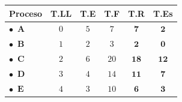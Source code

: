 \documentclass[10pt, a4paper]{article}
\begin{document}
\begin{minipage}{\linewidth}
\begin{minipage}[t]{0.275\linewidth}
\vspace{0pt}
\centering\footnotesize\setlength{\tabcolsep}{3.5pt}\renewcommand{\arraystretch}{1.1}
\begin{tabular}{lccccc}\toprule
\textbf{Proceso} & \textbf{T.LL} & \textbf{T.E} & \textbf{T.F} & \textbf{T.R} & \textbf{T.Es} \\ \midrule
\textcolor{col0}{$\bullet$}\ \textcolor{col0}{$\mathbf{A}$} & $0$ & $5$ & $7$ & \textcolor{tr}{$\boldsymbol{7}$} & \textcolor{es}{$\boldsymbol{2}$} \\
\textcolor{col1}{$\bullet$}\ \textcolor{col1}{$\mathbf{B}$} & $1$ & $2$ & $3$ & \textcolor{tr}{$\boldsymbol{2}$} & \textcolor{es}{$\boldsymbol{0}$} \\
\textcolor{col2}{$\bullet$}\ \textcolor{col2}{$\mathbf{C}$} & $2$ & $6$ & $20$ & \textcolor{tr}{$\boldsymbol{18}$} & \textcolor{es}{$\boldsymbol{12}$} \\
\textcolor{col3}{$\bullet$}\ \textcolor{col3}{$\mathbf{D}$} & $3$ & $4$ & $14$ & \textcolor{tr}{$\boldsymbol{11}$} & \textcolor{es}{$\boldsymbol{7}$} \\
\textcolor{col4}{$\bullet$}\ \textcolor{col4}{$\mathbf{E}$} & $4$ & $3$ & $10$ & \textcolor{tr}{$\boldsymbol{6}$} & \textcolor{es}{$\boldsymbol{3}$} \\
\bottomrule\end{tabular}\\[5pt]
\hspace{2mm}
\end{minipage}
\end{minipage}
\par\vspace{0.35cm}
\end{document}
